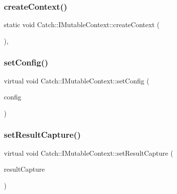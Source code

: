 \subsubsection{\texorpdfstring{createContext()}{createContext()}}
{\footnotesize\ttfamily static void Catch\+::\+I\+Mutable\+Context\+::create\+Context (\begin{DoxyParamCaption}{ }\end{DoxyParamCaption})\hspace{0.3cm}{\ttfamily [static]}, {\ttfamily [private]}}

\mbox{\label{struct_catch_1_1_i_mutable_context_aa81ba080fce084e9482f20338bc88531}} 
\subsubsection{\texorpdfstring{setConfig()}{setConfig()}}
{\footnotesize\ttfamily virtual void Catch\+::\+I\+Mutable\+Context\+::set\+Config (\begin{DoxyParamCaption}\item[{\mbox{\hyperlink{namespace_catch_afd20a5d4f9d2f4d525db81a7765367b0}{I\+Config\+Ptr}} const \&}]{config }\end{DoxyParamCaption})\hspace{0.3cm}{\ttfamily [pure virtual]}}

\mbox{\label{struct_catch_1_1_i_mutable_context_a4a80afd0525b7def21bee8d9b48f2d39}} 
\subsubsection{\texorpdfstring{setResultCapture()}{setResultCapture()}}
{\footnotesize\ttfamily virtual void Catch\+::\+I\+Mutable\+Context\+::set\+Result\+Capture (\begin{DoxyParamCaption}\item[{\mbox{\hyperlink{struct_catch_1_1_i_result_capture}{I\+Result\+Capture}} $\ast$}]{result\+Capture }\end{DoxyParamCaption})\hspace{0.3cm}{\ttfamily [pure virtual]}}

